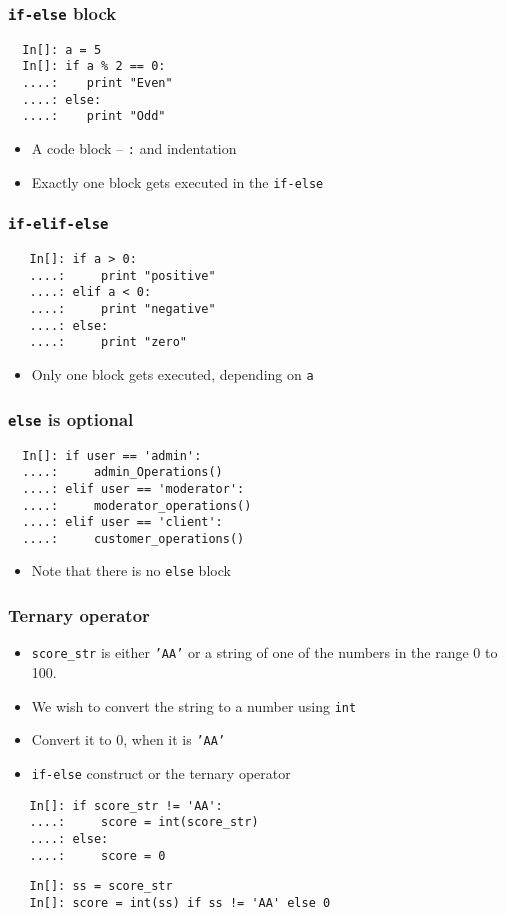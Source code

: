 \begin{frame}[fragile]
  \frametitle{\texttt{if-else} block}
  \begin{lstlisting}
  In[]: a = 5
  In[]: if a % 2 == 0:
  ....:    print "Even"
  ....: else:
  ....:    print "Odd"
  \end{lstlisting}
  \begin{itemize}
  \item A code block -- \texttt{:} and indentation
  \item Exactly one block gets executed in the \texttt{if-else}
  \end{itemize}
\end{frame}


\begin{frame}[fragile]
  \frametitle{\texttt{if-elif-else}}
  \begin{lstlisting}
   In[]: if a > 0:           
   ....:     print "positive"
   ....: elif a < 0:         
   ....:     print "negative"
   ....: else:               
   ....:     print "zero"    
  \end{lstlisting}
  \begin{itemize}
  \item Only one block gets executed, depending on \texttt{a}
  \end{itemize}
\end{frame}

\begin{frame}[fragile]
  \frametitle{\texttt{else} is optional}
  \begin{lstlisting}
  In[]: if user == 'admin':         
  ....:     admin_Operations()
  ....: elif user == 'moderator':   
  ....:     moderator_operations()
  ....: elif user == 'client':      
  ....:     customer_operations()
  \end{lstlisting}
  \begin{itemize}
  \item Note that there is no \texttt{else} block
  \end{itemize}
\end{frame}

\begin{frame}[fragile]
  \frametitle{Ternary operator}
  \begin{itemize}
  \item \texttt{score\_str} is either \texttt{'AA'} or a string of one
    of the numbers in the range 0 to 100. 
  \item We wish to convert the string to a number using \texttt{int}
  \item Convert it to 0, when it is \texttt{'AA'}
  \item \texttt{if-else} construct or the ternary operator
  \end{itemize}
  \begin{lstlisting}
   In[]: if score_str != 'AA':
   ....:     score = int(score_str)
   ....: else:
   ....:     score = 0
  \end{lstlisting}
  \begin{lstlisting}
   In[]: ss = score_str
   In[]: score = int(ss) if ss != 'AA' else 0
  \end{lstlisting}
\end{frame}


